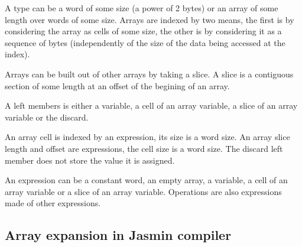 \documentclass{article}
\begin{document}
\smallskip

A type can be a word of some size (a power of 2 bytes) or an array of some
length over words of some size. Arrays are indexed by two means, the first is
by considering the array as cells of some size, the other is by considering it
as a sequence of bytes (independently of the size of the data being accessed at
the index).

Arrays can be built out of other arrays by taking a slice. A slice is a
contiguous section of some length at an offset of the begining of an array.

\smallskip

A left members is either a variable, a cell of an array variable, a slice of an
array variable or the discard.

An array cell is indexed by an expression, its size is a word size. An array
slice length and offset are expressions, the cell size is a word size. The
discard left member does not store the value it is assigned.

An expression can be a constant word, an empty array, a variable, a cell of an
array variable or a slice of an array variable. Operations are also expressions
made of other expressions.

\subsection{Array expansion in Jasmin compiler}
\end{document}
